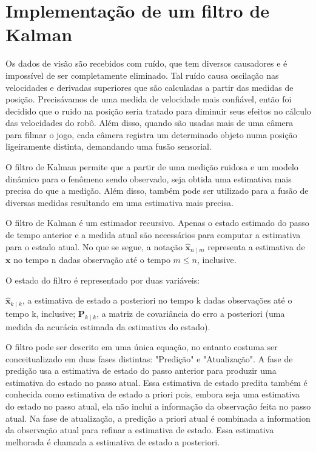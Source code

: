 \chapter{Implementação de um filtro de Kalman}\label{cap:kalman}

Os dados de visão são recebidos com ruído, que tem diversos causadores e é impossível de ser completamente eliminado. Tal ruído causa oscilação nas velocidades e derivadas superiores que são calculadas a partir das medidas de posição. Precisávamos de uma medida de velocidade mais confiável, então foi decidido que o ruido na posição seria tratado para diminuir seus efeitos no cálculo das velocidades do robô. Além disso, quando são usadas mais de uma câmera para filmar o jogo, cada câmera registra um determinado objeto numa posição ligeiramente distinta, demandando uma fusão sensorial.

O filtro de Kalman permite que a partir de uma medição ruidosa e um modelo dinâmico para o fenômeno sendo observado, seja obtida uma estimativa mais precisa do que a medição. Além disso, também pode ser utilizado para a fusão de diversas medidas resultando em uma estimativa mais precisa.

O filtro de Kalman é um estimador recursivo. Apenas o estado estimado do passo de tempo anterior e a medida atual são necessários para computar a estimativa para o estado atual. No que se segue, a notação $\displaystyle {\hat {\mathbf {x} }}_{n\mid m}$ representa a estimativa de ${\displaystyle \mathbf {x} }$ no tempo n dadas observação até o tempo $m \leq n$, inclusive.

O estado do filtro é representado por duas variáveis:

   ${\displaystyle {\hat {\mathbf {x} }}_{k\mid k}}$, a estimativa de estado a posteriori no tempo k dadas observações até o tempo k, inclusive;
   ${\displaystyle \mathbf {P} _{k\mid k}}$, a matriz de covariância do erro a posteriori (uma medida da acurácia estimada da estimativa do estado).

O filtro pode ser descrito em uma única equação, no entanto costuma ser conceitualizado em duas fases distintas: "Predição" e "Atualização". A fase de predição usa a estimativa de estado do passo anterior para produzir uma estimativa do estado no passo atual. Essa estimativa de estado predita também é conhecida como estimativa de estado a priori pois, embora seja uma estimativa do estado no passo atual, ela não inclui a informação da observação feita no passo atual. Na fase de atualização, a predição a priori atual é combinada a information da observação atual para refinar a estimativa de estado. Essa estimativa melhorada é chamada a estimativa de estado a posteriori.

